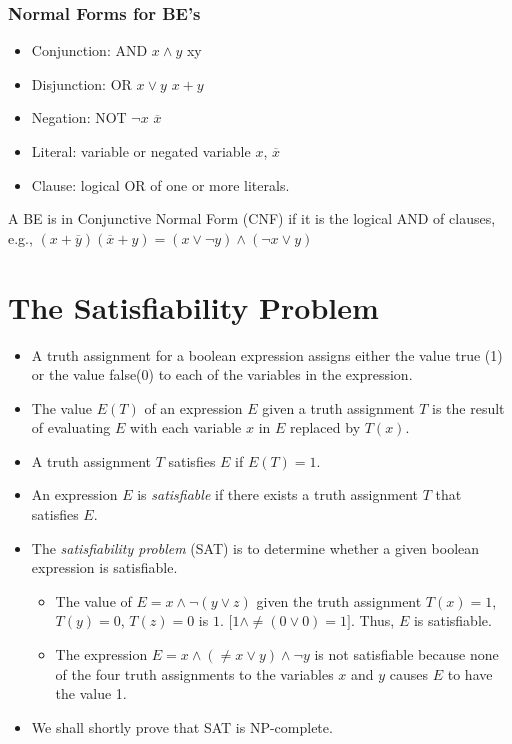 \documentclass[]{article}
\begin{document}
\subsubsection*{Normal Forms for BE's}
\begin{itemize}
\item Conjunction: AND $x \wedge y$ xy
\item Disjunction: OR $x \vee y$ $x + y$
\item Negation: NOT $\neg x$ $\overline{x}$
\item Literal: variable or negated variable $x$, $\overline{x}$
\item Clause: logical OR of one or more literals.
\end{itemize}
A BE is in Conjunctive Normal Form (CNF) if it is the logical AND of clauses,
e.g., $(x + \overline{y})(\overline{x} + y) = (x \vee \neg y)\wedge(\neg x \vee
y)$

\section{The Satisfiability Problem}
\begin{itemize}
\item A truth assignment for a boolean expression assigns either the value true
(1) or the value false(0) to each of the variables in the expression.
\item The value $E(T)$ of an expression $E$ given a truth assignment $T$ is the
result of evaluating $E$ with each variable $x$ in $E$ replaced by $T(x)$.
\item A truth assignment $T$ satisfies $E$ if $E(T) = 1$.
\item An expression $E$ is \emph{satisfiable} if there exists a truth assignment
$T$ that satisfies $E$.
\item The \emph{satisfiability problem} (SAT) is to determine whether a given
boolean expression is satisfiable.
\begin{itemize}
\item The value of $E = x \wedge \neg(y \vee z)$ given the truth assignment
$T(x) = 1$, $T(y) = 0$, $T(z) = 0$ is $1$. $\lbrack 1 \wedge \neq(0 \vee 0) = 1
\rbrack$. Thus, $E$ is satisfiable.
\item The expression $E = x \wedge(\neq x \vee y ) \wedge \neg y$ is not
satisfiable because none of the four truth assignments to the variables $x$ and
$y$ causes $E$ to have the value 1.
\end{itemize}
\item We shall shortly prove that SAT is NP-complete.
\end{itemize}
\end{document}
